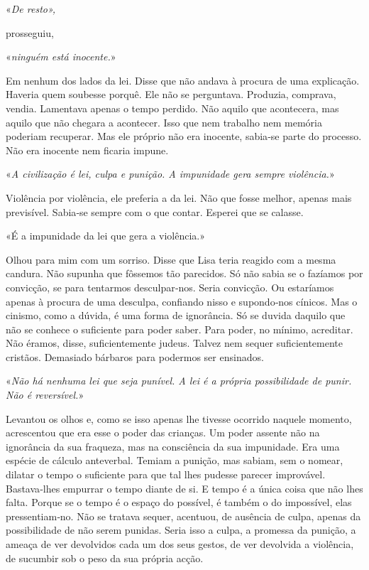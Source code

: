 «\emph{De resto»,}

prosseguiu,

«\emph{ninguém está inocente.}»

Em nenhum dos lados da lei. Disse que não andava à procura de uma
explicação. Haveria quem soubesse porquê. Ele não se perguntava.
Produzia, comprava, vendia. Lamentava apenas o tempo perdido. Não aquilo
que acontecera, mas aquilo que não chegara a acontecer. Isso que nem
trabalho nem memória poderiam recuperar. Mas ele próprio não era
inocente, sabia­‑se parte do processo. Não era inocente nem ficaria
impune.

«\emph{A civilização é lei, culpa e punição. A impunidade gera sempre
violência.}»

Violência por violência, ele preferia a da lei. Não que fosse melhor,
apenas mais previsível. Sabia­‑se sempre com o que contar. Esperei que
se calasse.

«É a impunidade da lei que gera a violência.»

Olhou para mim com um sorriso. Disse que Lisa teria reagido com a mesma
candura. Não supunha que fôssemos tão parecidos. Só não sabia se o
fazíamos por convicção, se para tentarmos desculpar­‑nos. Seria
convicção. Ou estaríamos apenas à procura de uma desculpa, confiando
nisso e supondo­‑nos cínicos. Mas o cinismo, como a dúvida, é uma forma
de ignorância. Só se duvida daquilo que não se conhece o suficiente para
poder saber. Para poder, no mínimo, acreditar. Não éramos, disse,
suficientemente judeus. Talvez nem sequer suficientemente cristãos.
Demasiado bárbaros para podermos ser ensinados.

«\emph{Não há nenhuma lei que seja punível. A lei é a própria
possibilidade de punir. Não é reversível.}»

Levantou os olhos e, como se isso apenas lhe tivesse ocorrido naquele
momento, acrescentou que era esse o poder das crianças. Um poder assente
não na ignorância da sua fraqueza, mas na consciência da sua impunidade.
Era uma espécie de cálculo anteverbal. Temiam a punição, mas sabiam, sem
o nomear, dilatar o tempo o suficiente para que tal lhes pudesse parecer
improvável. Bastava­‑lhes empurrar o tempo diante de si. E tempo é a
única coisa que não lhes falta. Porque se o tempo é o espaço do
possível, é também o do impossível, elas pressentiam­‑no. Não se tratava
sequer, acentuou, de ausência de culpa, apenas da possibilidade de não
serem punidas. Seria isso a culpa, a promessa da punição, a ameaça de
ver devolvidos cada um dos seus gestos, de ver devolvida a violência, de
sucumbir sob o peso da sua própria acção.

